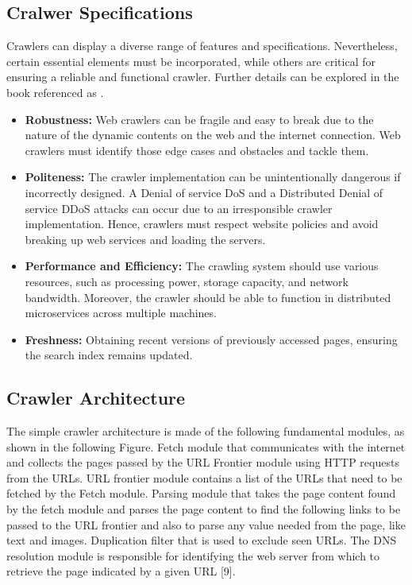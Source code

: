 \subsection{Cralwer Specifications}
Crawlers can display a diverse range of features and specifications. Nevertheless, certain essential elements must be incorporated, while others are critical for ensuring a reliable and functional crawler. Further details can be explored in the book referenced as \cite{introduction-ir}.

\begin{itemize}
\item[] \textbf{Robustness:} Web crawlers can be fragile and easy to break due to the nature of the dynamic contents on the web and the internet connection. Web crawlers must identify those edge cases and obstacles and tackle them.   

\item[] \textbf{Politeness:} The crawler implementation can be unintentionally dangerous if incorrectly designed. A Denial of service DoS and a Distributed Denial of service DDoS attacks can occur due to an irresponsible crawler implementation. Hence, crawlers must respect website policies and avoid breaking up web services and loading the servers.

\item[] \textbf{Performance and Efficiency:} The crawling system should use various resources, such as processing power, storage capacity, and network bandwidth. Moreover, the crawler should be able to function in distributed microservices across multiple machines.

\item[] \textbf{Freshness:} Obtaining recent versions of previously accessed pages, ensuring the search index remains updated.
\end{itemize}

\subsection{Crawler Architecture}

The simple crawler architecture is made of the following fundamental modules, as shown in the following Figure. Fetch module that communicates with the internet and collects the pages passed by the URL Frontier module using HTTP requests from the URLs. URL frontier module contains a list of the URLs that need to be fetched by the Fetch module. Parsing module that takes the page content found by the fetch module and parses the page content to find the following links to be passed to the URL frontier and also to parse any value needed from the page, like text and images. Duplication filter that is used to exclude seen URLs. The DNS resolution module is responsible for identifying the web server from which to retrieve the page indicated by a given URL [9]. 

